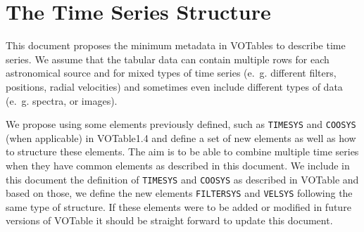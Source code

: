 \documentclass[11pt,a4paper]{ivoa}
\let\fg=\color
\def\elem#1{{\tt{\fg{DarkRed}#1}}}
\begin{document}

\section{The Time Series Structure}
\label{elem:TIMESERIES}
This document proposes the minimum metadata in VOTables to describe time series. We assume that the tabular data can contain multiple rows for each astronomical source and for mixed types of time series (e.~g. different filters, positions, radial velocities) and sometimes even include different types of data (e.~g. spectra, or images). 

We propose using some elements previously defined, such as \elem{TIMESYS} and \elem{COOSYS} (when applicable) in VOTable1.4 \cite{VOTable1.4} and define a set of new elements as well as how to structure these elements. The aim is to be able to combine multiple time series when they have common elements as described in this document. We include in this document the definition of \elem{TIMESYS} and \elem{COOSYS} as described in VOTable and based on those, we define the new elements \elem{FILTERSYS} and \elem{VELSYS} following the same type of structure. If these elements were to be added or modified in future versions of VOTable it should be straight forward to update this document. 
\end{document}
